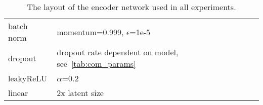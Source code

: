 \documentclass[10pt]{article} \usepackage[accepted]{tmlr}
\begin{document}
\begin{table}[h]
{\begin{tabular}{ll}
\multicolumn{1}{l|}{batch norm}      & momentum=0.999, $\epsilon$=1e-5                                                        \\
\multicolumn{1}{l|}{dropout}        & dropout rate dependent on model, see~\ref{tab:com_params}                                                          \\
\multicolumn{1}{l|}{leakyReLU}      & $\alpha$=0.2                                                                            \\
\multicolumn{1}{l|}{linear}         & 2x latent size                                                                       
\end{tabular}}
\caption{\label{tab:enc_archi} The layout of the encoder network used in all experiments.}
\end{table}
\begin{table}[h]
\end{table}
\end{document}
